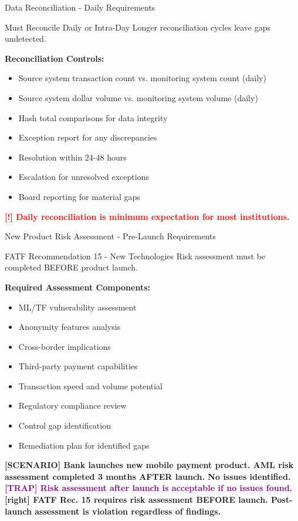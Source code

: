 \documentclass[11pt,a4paper]{beamer}
\newcommand{\redflag}[1]{\textcolor{red}{\textbf{[!] #1}}}
\newcommand{\trap}[1]{\textcolor{purple}{\textbf{[TRAP] #1}}}
\newcommand{\correct}[1]{\textcolor{green!50!black}{\textbf{[right] #1}}}
\newcommand{\scenario}[1]{\textcolor{blue!70!black}{\textbf{[SCENARIO] #1}}}
\begin{document}
\begin{frame}{Data Reconciliation - Daily Requirements}
\begin{block}{Must Reconcile Daily or Intra-Day}
Longer reconciliation cycles leave gaps undetected.
\end{block}
\textbf{Reconciliation Controls:}
\begin{itemize}
\item Source system transaction count vs. monitoring system count (daily)
\item Source system dollar volume vs. monitoring system volume (daily)
\item Hash total comparisons for data integrity
\item Exception report for any discrepancies
\item Resolution within 24-48 hours
\item Escalation for unresolved exceptions
\item Board reporting for material gaps
\end{itemize}
\redflag{Daily reconciliation is minimum expectation for most institutions.}
\end{frame}


\begin{frame}{New Product Risk Assessment - Pre-Launch Requirements}
\begin{block}{FATF Recommendation 15 - New Technologies}
Risk assessment must be completed BEFORE product launch.
\end{block}
\textbf{Required Assessment Components:}
\begin{itemize}
\item ML/TF vulnerability assessment
\item Anonymity features analysis
\item Cross-border implications
\item Third-party payment capabilities
\item Transaction speed and volume potential
\item Regulatory compliance review
\item Control gap identification
\item Remediation plan for identified gaps
\end{itemize}
\scenario{Bank launches new mobile payment product. AML risk assessment completed 3 months AFTER launch. No issues identified.}
\trap{Risk assessment after launch is acceptable if no issues found.}
\correct{FATF Rec. 15 requires risk assessment BEFORE launch. Post-launch assessment is violation regardless of findings.}
\end{frame}
\end{document}
